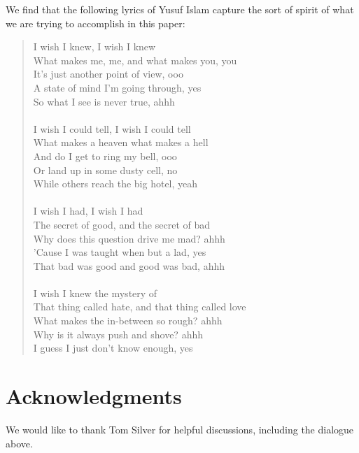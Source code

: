 \documentclass{article}
\begin{document}
We find that the following lyrics of Yusuf Islam \cite{iwish} capture
the sort of spirit of what we are trying to accomplish in this paper:
\begin{quote}
  I wish I knew, I wish I knew\\
  What makes me, me, and what makes you, you\\
  It's just another point of view, ooo\\
  A state of mind I'm going through, yes\\
  So what I see is never true, ahhh\\
\\
  I wish I could tell, I wish I could tell\\
  What makes a heaven what makes a hell\\
  And do I get to ring my bell, ooo\\
  Or land up in some dusty cell, no\\
  While others reach the big hotel, yeah\\
\\
  I wish I had, I wish I had\\
  The secret of good, and the secret of bad\\
  Why does this question drive me mad? ahhh\\
  'Cause I was taught when but a lad, yes\\
  That bad was good and good was bad, ahhh\\
\\
  I wish I knew the mystery of\\
  That thing called hate, and that thing called love\\
  What makes the in-between so rough? ahhh\\
  Why is it always push and shove? ahhh\\
  I guess I just don't know enough, yes\\
\end{quote}

\section{Acknowledgments}

We would like to thank Tom Silver for helpful discussions, including
the dialogue above.

 

\end{document}
